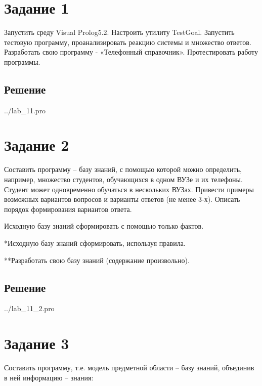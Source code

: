\section*{Задание 1}
Запустить среду Visual Prolog5.2. Настроить утилиту TestGoal. Запустить тестовую программу, проанализировать реакцию системы и множество ответов. Разработать свою программу - «Телефонный справочник». Протестировать работу программы.

\subsection*{Решение}
\begin{lstinputlisting}[label=third,caption=Решение задания №1, language=lisp, firstline=12, lastline=23]{../lab_11.pro}
\end{lstinputlisting}

\section*{Задание 2}
Составить программу – базу знаний, с помощью которой можно определить, например, множество студентов, обучающихся в одном ВУЗе и их телефоны. Студент может одновременно обучаться в нескольких ВУЗах. Привести примеры возможных вариантов вопросов и варианты ответов (не менее 3-х). Описать порядок формирования вариантов ответа.

Исходную базу знаний сформировать с помощью только фактов.

*Исходную базу знаний сформировать, используя правила.

**Разработать свою базу знаний (содержание произвольно).

\subsection*{Решение}

\begin{lstinputlisting}[label=third,caption=Решение задания №1, language=lisp, firstline=12, lastline=38]{../lab_11_2.pro}
\end{lstinputlisting}

\section*{Задание 3}
Составить программу, т.е. модель предметной области – базу знаний, объединив в ней
информацию – знания:


